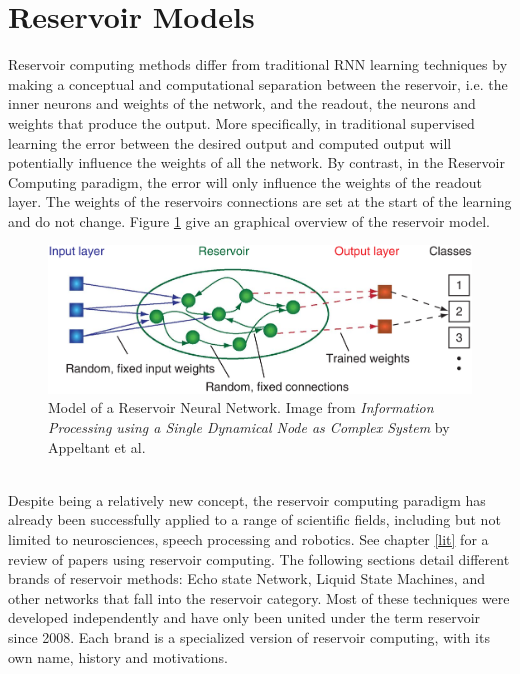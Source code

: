 \documentclass[12pt,oneside]{CUNY_CS_PhD}
\begin{document}
\section{Reservoir Models}
Reservoir computing methods differ from traditional RNN learning techniques by making a conceptual  and computational separation between the reservoir, i.e. the inner neurons and weights of the network, and the readout, the neurons and weights that produce the output. More specifically, in traditional supervised learning the error between the desired output and computed output will potentially influence the weights of all the network. By contrast, in the Reservoir Computing paradigm, the error will only influence the weights of the readout layer. The weights of the reservoirs connections are set at the start of the learning and do not change. Figure \ref{fig:reservoir} give an graphical overview of the reservoir model.
\begin{figure}[!htbp]
\centering
\includegraphics[width=1.0\textwidth]{pictures/reservoir_network.png}
\caption{Model of a Reservoir Neural Network. Image from \textit{Information Processing using a Single Dynamical Node as Complex System} by Appeltant et al. \cite{appeltant2011information} }
\label{fig:reservoir}
\end{figure}\\
Despite being a relatively new concept, the reservoir computing paradigm has already been successfully applied to a range of scientific fields, including but not limited to neurosciences, speech processing and robotics. See chapter \ref{lit} for a review of papers using reservoir computing. The following sections detail different brands of reservoir methods: Echo state Network, Liquid State Machines, and other networks that fall into the reservoir category. Most of these techniques were developed independently and have only been united under the term reservoir since 2008. Each brand is a specialized version of reservoir computing, with its own name, history and motivations.
\end{document}
